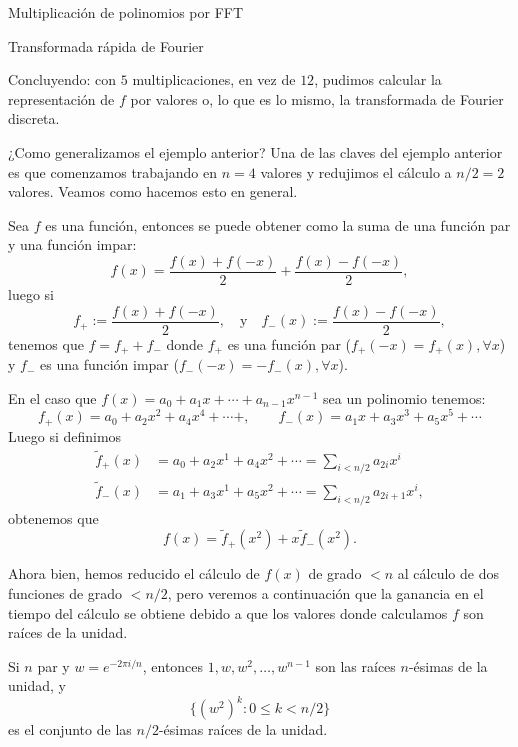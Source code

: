 \begin{chapter}{Multiplicación de polinomios por FFT}
\begin{section}{Transformada rápida de Fourier}
\begin{ejemplo*}
        Concluyendo: con $5$ multiplicaciones,  en vez de $12$, pudimos calcular la representación de $f$ por valores o, lo que es lo mismo, la transformada de Fourier discreta.
    \end{ejemplo*}

    ¿Como generalizamos el ejemplo anterior? Una de las claves del ejemplo anterior es que comenzamos trabajando en $n=4$ valores y redujimos  el cálculo a $n/2=2$ valores. Veamos como hacemos esto en general.

    Sea  $f$  es una función, entonces se puede obtener como la suma de una función par y una función impar:
    $$
        f(x) = \frac{f(x) + f(-x)}{2} + \frac{f(x) - f(-x)}{2},
    $$
    luego si
    $$
        f_+ := \frac{f(x) + f(-x)}{2}, \quad \text{y} \quad f_-(x):= \frac{f(x) - f(-x)}{2},
    $$
    tenemos que $f = f_+ + f_-$ donde $f_+$ es una función par ($f_+(-x) = f_+(x), \forall x$) y   $f_-$ es una función impar ($f_-(-x) = -f_-(x), \forall x$).

    En  el caso que $f(x)= a_0 + a_1x + \cdots + a_{n-1}x^{n-1}$ sea un polinomio tenemos:
    $$
        f_+(x) = a_0 + a_2 x^2 + a_4 x^4 + \cdots + , \qquad f_-(x) = a_1x + a_3 x^3 + a_5 x^5 + \cdots
    $$
    Luego  si definimos
    \begin{align*}
        \tilde{f}_+(x) & = a_0 + a_2 x^1 + a_4 x^2 + \cdots = \sum_{i<n/2} a_{2i}x^i   \\
        \tilde{f}_-(x) & = a_1 + a_3 x^1 + a_5 x^2 + \cdots= \sum_{i<n/2} a_{2i+1}x^i,
    \end{align*}
    obtenemos que
    \begin{equation}\label{eq-par-mas-impar}
        f(x) = \tilde{f}_+(x^2) + x \tilde{f}_-(x^2).
    \end{equation}

    Ahora bien,  hemos reducido el cálculo de $f(x)$ de grado $<n$ al cálculo de dos funciones de grado $< n/2$, pero veremos a continuación que la ganancia en el tiempo del cálculo se obtiene debido a que los valores donde calculamos $f$ son raíces de la unidad.

    \begin{observacion}\label{obs-raices-unidad-div-2} Si $n$ par y $w = e^{-2\pi i /n}$,  entonces $1, w, w^2,\ldots, w^{n-1}$ son las raíces $n$-ésimas de la unidad,  y
        $$
            \{(w^2)^k: 0 \le k < {n}/{2}\}
        $$
        es el conjunto de las $n/2$-ésimas  raíces de la unidad.
    \end{observacion}


\end{section}
\end{chapter}
